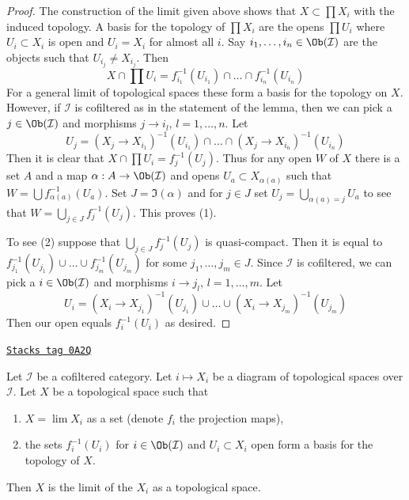 \begin{proof}
The construction of the limit given above shows that $X \subset \prod X_i$
with the induced topology. A basis for the topology of $\prod X_i$ are
the opens $\prod U_i$ where $U_i \subset X_i$ is open and $U_i = X_i$
for almost all $i$. Say $i_1, \ldots, i_n \in \Ob(\mathcal{I})$ are the
objects such that $U_{i_j} \not = X_{i_j}$. Then
$$
X \cap \prod U_i = f_{i_1}^{-1}(U_{i_1}) \cap \ldots \cap f_{i_n}^{-1}(U_{i_n})
$$
For a general limit of topological spaces these form a basis for the
topology on $X$. However, if $\mathcal{I}$ is cofiltered as in the statement
of the lemma, then we can pick a $j \in \Ob(\mathcal{I})$ and morphisms
$j \to i_l$, $l = 1, \ldots, n$. Let
$$
U_j =
(X_j \to X_{i_1})^{-1}(U_{i_1}) \cap \ldots \cap
(X_j \to X_{i_n})^{-1}(U_{i_n})
$$
Then it is clear that $X \cap \prod U_i = f_j^{-1}(U_j)$. Thus for any open
$W$ of $X$ there is a set $A$ and a map $\alpha : A \to \Ob(\mathcal{I})$ and
opens $U_a \subset X_{\alpha(a)}$ such that
$W = \bigcup f_{\alpha(a)}^{-1}(U_a)$. Set $J = \Im(\alpha)$ and
for $j \in J$ set $U_j = \bigcup_{\alpha(a) = j} U_a$ to see that
$W = \bigcup_{j \in J} f_j^{-1}(U_j)$.
This proves (1).

\medskip\noindent
To see (2) suppose that $\bigcup_{j \in J} f_j^{-1}(U_j)$ is quasi-compact.
Then it is equal to
$f_{j_1}^{-1}(U_{j_1}) \cup \ldots \cup f_{j_m}^{-1}(U_{j_m})$
for some $j_1, \ldots, j_m \in J$. Since $\mathcal{I}$ is cofiltered,
we can pick a $i \in \Ob(\mathcal{I})$ and morphisms
$i \to j_l$, $l = 1, \ldots, m$. Let
$$
U_i =
(X_i \to X_{j_1})^{-1}(U_{j_1}) \cup \ldots \cup
(X_i \to X_{j_m})^{-1}(U_{j_m})
$$
Then our open equals $f_i^{-1}(U_i)$ as desired.
\end{proof}

\begin{lemma}
\label{topology-lemma-characterize-limit}
\href{https://stacks.math.columbia.edu/tag/0A2Q}{\texttt{Stacks tag 0A2Q}}

Let $\mathcal{I}$ be a cofiltered category. Let $i \mapsto X_i$ be a diagram
of topological spaces over $\mathcal{I}$. Let $X$ be a topological
space such that
\begin{enumerate}
\item $X = \lim X_i$ as a set (denote $f_i$ the projection maps),
\item the sets $f_i^{-1}(U_i)$ for $i \in \Ob(\mathcal{I})$ and
$U_i \subset X_i$ open form a basis for the topology of $X$.
\end{enumerate}
Then $X$ is the limit of the $X_i$ as a topological space.
\end{lemma}

